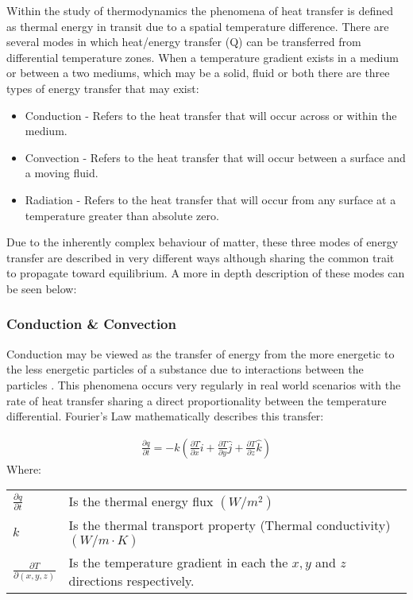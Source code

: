 \documentclass[12pt]{article}
\newcommand{\ts}{\textsuperscript}
\newcommand{\mycite}[1]{\ts{\cite{#1}}}
\begin{document}
Within the study of thermodynamics the phenomena of heat transfer is defined as thermal energy in transit due to a spatial temperature difference\mycite{bergman2011fundamentals}.
There are several modes in which heat/energy transfer (Q) can be transferred from differential temperature zones. When a temperature gradient exists in a medium or between a two mediums, which may be a solid, fluid or both there are three types of energy transfer that may exist: 
\begin{itemize}
	\item Conduction - Refers to the heat transfer that will occur across or within the medium. 
	\item Convection - Refers to the heat transfer that will occur between a surface and a moving fluid. 
	\item Radiation - Refers to the heat transfer that will occur from any surface at a temperature greater than absolute zero. 
\end{itemize}

Due to the inherently complex behaviour of matter, these three modes of energy transfer are described in very different ways although sharing the common trait to propagate toward equilibrium. A more in depth description of these modes can be seen below:  

\subsubsection{Conduction \& Convection}
Conduction may be viewed as the transfer of energy from the more energetic to the less
energetic particles of a substance due to interactions between the particles \mycite{bergman2011fundamentals}. This phenomena occurs very regularly in real world scenarios with the rate of heat transfer sharing a direct proportionality between the temperature differential. Fourier's Law mathematically describes this transfer:

\begin{align} \label{condCart}
\frac{\partial q}{\partial t} = -k \left( \frac{\partial T}{\partial x} \hat{i} + \frac{\partial T}{\partial y} \hat{j} + \frac{\partial T}{\partial z} \hat{k} \right)
\end{align}
Where: \\ 
\begin{tabular}{l | l}
	$\frac{\partial q}{\partial t}$ & Is the thermal energy flux $(W/m^2)$ \\ 
	$k$ & Is the thermal transport property (Thermal conductivity) $(W/m \cdot K)$ \\ 
	$\frac{\partial T}{\partial(x,y,z)}$ & Is the temperature gradient in each the $x,y$ and $z$ directions respectively. 
\end{tabular}
\end{document}
